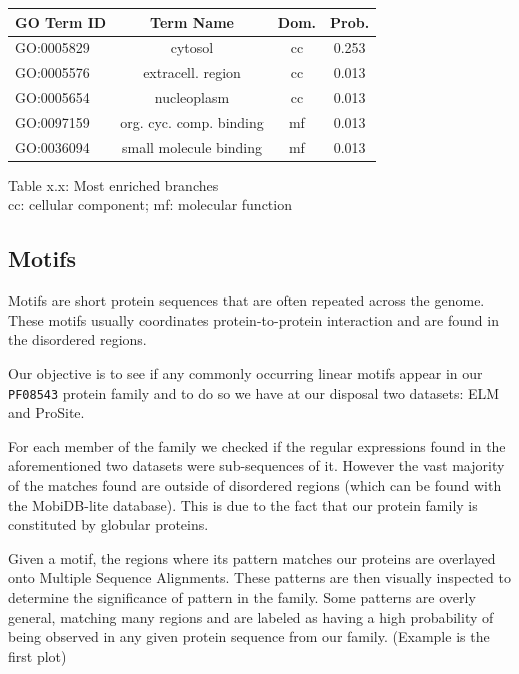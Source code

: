 \documentclass[10pt,twocolumn,letterpaper]{article}
\begin{document}
\begin{center}
    \begin{tabular}{lccc}
        \toprule
        GO Term ID & Term Name & Dom. & Prob. \\
        \midrule
        GO:0005829	& \small{cytosol} & cc & 0.253 \\
        GO:0005576	& \small{extracell. region} & cc & 0.013 \\
        GO:0005654	& \small{nucleoplasm} &	cc & 0.013 \\
        GO:0097159	& \small{org. cyc. comp. binding} & mf	& 0.013 \\
        GO:0036094	& \small{small molecule binding} & mf & 0.013 \\
        \bottomrule
    \end{tabular}
\end{center} 
\begin{center}
    \small{Table x.x: Most enriched branches}\\
    \small{cc: cellular component; mf: molecular function}\\
    
\end{center}



\subsection{Motifs}
Motifs are short protein sequences that are often repeated across the genome. These motifs usually coordinates protein-to-protein interaction and are found in the disordered regions. 

Our objective is to see if any commonly occurring linear motifs appear in our \texttt{PF08543} protein family and to do so we have at our disposal two datasets: ELM and ProSite.

For each member of the family we checked if the regular expressions found in the aforementioned two datasets were sub-sequences of it. However the vast majority of the matches found are outside of disordered regions (which can be found with the MobiDB-lite database). This is due to the fact that our protein family is constituted by globular proteins.

Given a motif, the regions where its pattern matches our proteins are overlayed onto Multiple Sequence Alignments. These patterns are then visually inspected to determine the significance of pattern in the family.
Some patterns are overly general, matching many regions and are labeled as having a high probability of being observed in any given protein sequence from our family. (Example is the first plot)
\end{document}
